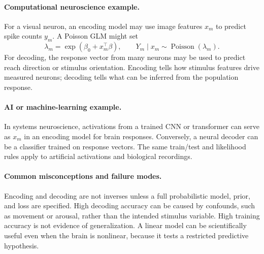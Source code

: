 \paragraph{Computational neuroscience example.}
For a visual neuron, an encoding model may use image features \(x_m\) to predict spike counts \(y_m\). A Poisson GLM might set
\[
\lambda_m=\exp(\beta_0+x_m^\top\beta),\qquad
Y_m\mid x_m\sim\operatorname{Poisson}(\lambda_m).
\]
For decoding, the response vector from many neurons may be used to predict reach direction or stimulus orientation. Encoding tells how stimulus features drive measured neurons; decoding tells what can be inferred from the population response.

\paragraph{AI or machine-learning example.}
In systems neuroscience, activations from a trained CNN or transformer can serve as \(x_m\) in an encoding model for brain responses. Conversely, a neural decoder can be a classifier trained on response vectors. The same train/test and likelihood rules apply to artificial activations and biological recordings.

\paragraph{Common misconceptions and failure modes.}
Encoding and decoding are not inverses unless a full probabilistic model, prior, and loss are specified. High decoding accuracy can be caused by confounds, such as movement or arousal, rather than the intended stimulus variable. High training accuracy is not evidence of generalization. A linear model can be scientifically useful even when the brain is nonlinear, because it tests a restricted predictive hypothesis.

